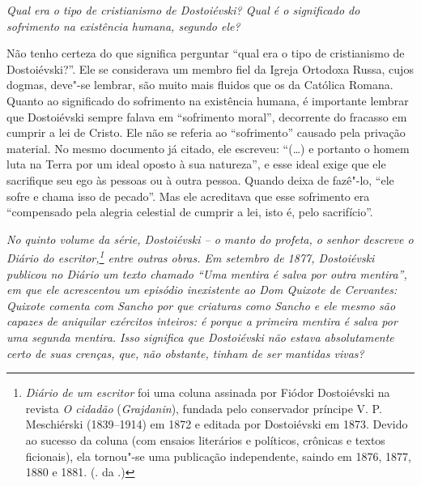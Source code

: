 \medskip

\emph{Qual era o tipo de cristianismo de Dostoiévski? Qual é o significado
do sofrimento na existência humana, segundo ele?}

Não tenho certeza do que significa perguntar ``qual era o tipo de
cristianismo de Dostoiévski?''. Ele se considerava um membro fiel da
Igreja Ortodoxa Russa, cujos dogmas, deve"-se lembrar, são muito mais
fluidos que os da Católica Romana. Quanto ao significado do sofrimento
na existência humana, é importante lembrar que Dostoiévski sempre falava
em ``sofrimento moral'', decorrente do fracasso em cumprir a lei de
Cristo. Ele não se referia ao ``sofrimento'' causado pela privação
material. No mesmo documento já citado, ele escreveu: ``(\ldots{}) e portanto o homem
luta na Terra por um ideal oposto à sua natureza'', e esse
ideal exige que ele sacrifique seu ego às pessoas ou à outra pessoa.
Quando deixa de fazê"-lo, ``ele sofre e chama isso de pecado''. Mas ele
acreditava que esse sofrimento era ``compensado pela alegria celestial de
cumprir a lei, isto é, pelo sacrifício''.

\medskip

\emph{No quinto volume da série, \emph{Dostoiévski -- o manto do profeta}, o
senhor descreve o \emph{Diário do escritor},\footnote{\emph{Diário de um escritor} foi uma coluna assinada por Fiódor Dostoiévski na revista \emph{O cidadão} (\emph{Grajdanin}), fundada pelo conservador príncipe V. P. Meschiérski (1839--1914) em 1872 e editada por Dostoiévski em 1873. Devido ao sucesso da coluna (com ensaios literários e políticos, crônicas e textos ficionais), ela tornou"-se uma publicação independente, saindo em 1876, 1877, 1880 e 1881. (. da .)} entre outras obras.
Em setembro de 1877, Dostoiévski publicou no \emph{Diário} um texto
chamado ``Uma mentira é salva por outra mentira'', em que ele acrescentou
um episódio inexistente ao \emph{Dom Quixote} de Cervantes: Quixote comenta
com Sancho por que criaturas como Sancho e ele mesmo são capazes de aniquilar exércitos
inteiros: é porque a primeira mentira é salva por uma segunda mentira.
Isso significa que Dostoiévski não estava absolutamente certo de suas
crenças, que, não obstante, tinham de ser mantidas vivas?}

